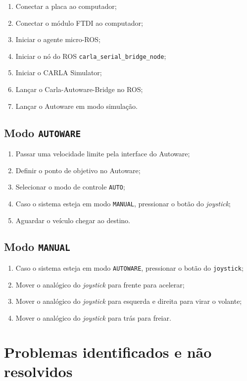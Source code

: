 \begin{enumerate}
	\item Conectar a placa ao computador;
	\item Conectar o módulo FTDI ao computador;
	\item Iniciar o agente micro-ROS;
	\item Iniciar o nó do ROS \texttt{carla\_serial\_bridge\_node};
	\item Iniciar o CARLA Simulator;
	\item Lançar o Carla-Autoware-Bridge no ROS;
	\item Lançar o Autoware em modo simulação.
\end{enumerate}

\subsection{Modo \texttt{AUTOWARE}}

\begin{enumerate}
	\item Passar uma velocidade limite pela interface do Autoware;
	\item Definir o ponto de objetivo no Autoware;
	\item Selecionar o modo de controle \texttt{AUTO};
	\item Caso o sistema esteja em modo \texttt{MANUAL}, pressionar o botão do \textit{joystick};
	\item Aguardar o veículo chegar ao destino.
\end{enumerate}

\subsection{Modo \texttt{MANUAL}}

\begin{enumerate}
	\item Caso o sistema esteja em modo \texttt{AUTOWARE}, pressionar o botão do \texttt{joystick};
	\item Mover o analógico do \textit{joystick} para frente para acelerar;
	\item Mover o analógico do \textit{joystick} para esquerda e direita para virar o volante;
	\item Mover o analógico do \textit{joystick} para trás para freiar.
\end{enumerate}

\clearpage


\section{Problemas identificados e não resolvidos}

